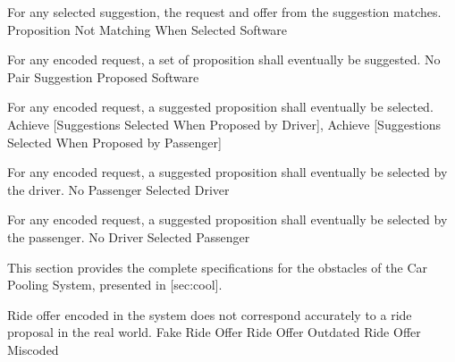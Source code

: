  \startkaosspec
  	 {For any selected suggestion, the request and offer from the suggestion matches.}
  	 {Proposition Not Matching When Selected}
  	 {Software}
  \stopkaosspec

  \startkaosspec
  	 {For any encoded request, a set of proposition shall eventually be suggested.}
  	 {No Pair Suggestion Proposed}
  	 {Software}
  \stopkaosspec

  \startkaosspec
  	 {For any encoded request, a suggested proposition shall eventually be selected.}
  	 {Achieve [Suggestions Selected When Proposed by Driver], Achieve [Suggestions Selected When Proposed by Passenger]}
  \stopkaosspec

  \startkaosspec
  	 {For any encoded request, a suggested proposition shall eventually be selected by the driver.}
  	 {No Passenger Selected}
  	 {Driver}
  \stopkaosspec

  \startkaosspec
  	 {For any encoded request, a suggested proposition shall eventually be selected by the passenger.}
  	 {No Driver Selected}
  	 {Passenger}
  \stopkaosspec
  
\stopsubsection

\startsubsection[title={Obstacle specifications}]

  This section provides the complete specifications for the obstacles of the
  Car Pooling System, presented in [sec:cool].


    {}

  \startkaosspec
  	 {Ride offer encoded in the system does not correspond accurately to a ride proposal in the real world.}
  	 {Fake Ride Offer}
  	 {Ride Offer Outdated}
  	 {Ride Offer Miscoded}
  \stopkaosspec

